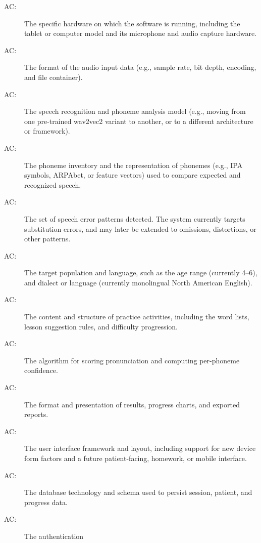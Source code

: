 \documentclass[12pt, titlepage]{article}
\newcounter{acnum}
\newcommand{\actheacnum}{AC\theacnum}
\begin{document}
\begin{description}
\item[ \actheacnum \label{acHardware}:] The specific
  hardware on which the software is running, including the tablet or computer
  model and its microphone and audio capture hardware.
\item[ \actheacnum \label{acInput}:] The format of the
  audio input data (e.g., sample rate, bit depth, encoding, and file container).
\item[ \actheacnum \label{acModel}:] The speech
  recognition and phoneme analysis model (e.g., moving from one pre-trained
  wav2vec2 variant to another, or to a different architecture or framework).
\item[ \actheacnum \label{acPhonemeSet}:] The phoneme
  inventory and the representation of phonemes (e.g., IPA symbols, ARPAbet, or
  feature vectors) used to compare expected and recognized speech.
\item[ \actheacnum \label{acErrorTypes}:] The set of
  speech error patterns detected. The system currently targets substitution
  errors, and may later be extended to omissions, distortions, or other
  patterns.
\item[ \actheacnum \label{acPopulation}:] The target
  population and language, such as the age range (currently 4--6), and
  dialect or language (currently monolingual North American English).
\item[ \actheacnum \label{acPractice}:] The content and
  structure of practice activities, including the word lists, lesson
  suggestion rules, and difficulty progression.
\item[ \actheacnum \label{acScoring}:] The algorithm for
  scoring pronunciation and computing per-phoneme confidence.
\item[ \actheacnum \label{acVisual}:] The format and
  presentation of results, progress charts, and exported reports.
\item[ \actheacnum \label{acUI}:] The user interface
  framework and layout, including support for new device form factors and a
  future patient-facing, homework, or mobile interface.
\item[ \actheacnum \label{acDB}:] The database
  technology and schema used to persist session, patient, and progress data.
\item[ \actheacnum \label{acAuth}:] The authentication

\end{description}
\end{document}
